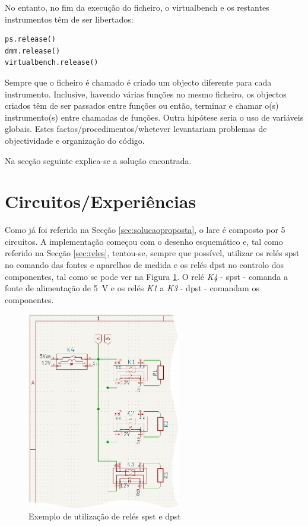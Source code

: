 No entanto, no fim da execução do ficheiro, o \acrshort{virtualbench} e os restantes instrumentos têm de ser libertados:
\begin{center}
	\begin{minipage}{0.75\linewidth}
		\begin{lstlisting}[language=Python, caption=Libertar instrumentos e \acrshort{virtualbench}, label=lst:libertarinstrumentos]
ps.release()
dmm.release()
virtualbench.release()
\end{lstlisting}
	\end{minipage}
\end{center}

Sempre que o ficheiro é chamado é criado um objecto diferente para cada instrumento. Inclusive, havendo várias funções no mesmo ficheiro, os objectos criados têm de ser passados entre funções ou então, terminar e chamar o(s) instrumento(s) entre chamadas de funções. Outra hipótese seria o uso de variáveis globais. Estes factos/procedimentos/whetever levantariam problemas de objectividade e organização do código.

Na secção seguinte explica-se a solução encontrada.

\section{Circuitos/Experiências}
\label{sec:experiencias}
Como já foi referido na Secção \ref{sec:solucaoproposta}, o \acrshort{lare} é composto por 5 circuitos. A implementação começou com o desenho esquemático e, tal como referido na Secção \ref{sec:reles}, tentou-se, sempre que possível, utilizar os relés \acrshort{spst} no comando das fontes e aparelhos de medida e os relés \acrshort{dpst} no controlo dos componentes, tal como se pode ver na Figura \ref{fig:relespstdpst}. O relé \textit{K4} - \acrshort{spst} - comanda a fonte de alimentação de \SI{5}{\volt} e os relés \textit{K1} a \textit{K3} - \acrshort{dpst} - comandam os componentes.

\begin{figure}[hbtp]
	\centering
	\includegraphics[width=0.6\textwidth]{figures/exemplo_reles_spst.png}
	\caption{Exemplo de utilização de relés \acrshort{spst} e \acrshort{dpst}}
	\label{fig:relespstdpst}
\end{figure}

